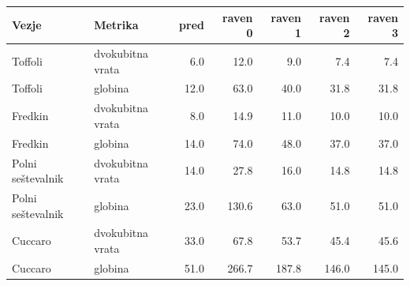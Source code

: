 \begin{tabular}{llrrrrr}
\toprule
Vezje & Metrika & pred & raven 0 & raven 1 & raven 2 & raven 3 \\
\midrule
Toffoli & dvokubitna vrata & 6.0 & 12.0 & 9.0 & 7.4 & 7.4 \\
Toffoli & globina & 12.0 & 63.0 & 40.0 & 31.8 & 31.8 \\
Fredkin & dvokubitna vrata & 8.0 & 14.9 & 11.0 & 10.0 & 10.0 \\
Fredkin & globina & 14.0 & 74.0 & 48.0 & 37.0 & 37.0 \\
Polni seštevalnik & dvokubitna vrata & 14.0 & 27.8 & 16.0 & 14.8 & 14.8 \\
Polni seštevalnik & globina & 23.0 & 130.6 & 63.0 & 51.0 & 51.0 \\
Cuccaro & dvokubitna vrata & 33.0 & 67.8 & 53.7 & 45.4 & 45.6 \\
Cuccaro & globina & 51.0 & 266.7 & 187.8 & 146.0 & 145.0 \\
\bottomrule
\end{tabular}
